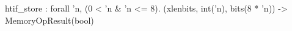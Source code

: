 htif_store : forall 'n, (0 < 'n & 'n <= 8). (xlenbits, int('n), bits(8 * 'n)) -> MemoryOpResult(bool)